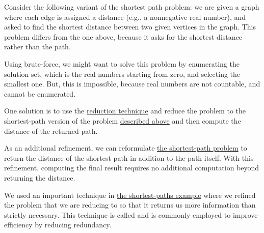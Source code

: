 \begin{cluster}
\label{grp:ex:design::bf::shortest-distances}

\begin{example}
\label{ex:design::bf::shortest-distances}
Consider the following variant of the shortest path problem: we are
given a graph where each edge is assigned a distance
(e.g., a nonnegative real number), 
and asked to find the shortest distance between two given vertices in
the graph.  This problem differs from the one above, because it asks
for the shortest distance rather than the path.

Using brute-force, we might want to solve this problem by enumerating
the solution set, which is the real numbers starting from zero, and
selecting the smallest one.
But, this is impossible, because real numbers are not countable, and
cannot be enumerated.

One solution is to use the \href{sec:design::reduction}{reduction technique}
and reduce the problem to the shortest-path version of the problem \href{ex:design::bf::shortest-paths}{described above} and then compute the distance of the returned path.

As an additional refinement, we can reformulate \href{ex:design::bf::shortest-paths}{the shortest-path problem} to return the distance of the shortest path in addition to the path itself.  
With this refinement, computing the final result requires no
additional computation beyond returning the distance.

\end{example}
\end{cluster}

\begin{cluster}
\label{grp:imp:design::basics::strengthening}

\begin{important}[Strengthening]
\label{imp:design::basics::strengthening}
We used an important technique in
\href{ex:design::bf::shortest-distances}{the shortest-paths example} where we refined the problem that we are reducing to so that it returns us more information than strictly necessary.  
This technique is called  and is commonly employed
to improve efficiency by reducing redundancy.

\end{important}
\end{cluster}

